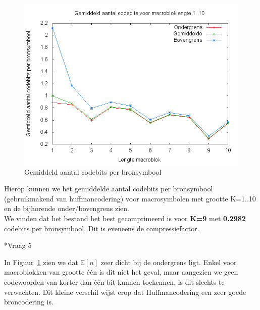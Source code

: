 \documentclass[]{article}
\begin{document}
\begin{section}
\begin{subsection}
        \begin{figure}[h]
        	  \centering
            \includegraphics[width=\textwidth]{vraag1_4.png}
            \caption{Gemiddeld aantal codebits per bronsymbool}
            \label{fig:codebits}
        \end{figure}

        Hierop kunnen we het gemiddelde aantal codebits per bronsymbool
        (gebruikmakend van huffmancodering) voor macrosymbolen met
        grootte K=1..10 en de bijhorende onder/bovengrens zien. \\

        We vinden dat het bestand het best gecomprimeerd is voor \textbf{K=9} met \textbf{0.2982} codebits per bronsymbool. Dit is eveneens de compressiefactor.
		
    \end{subsection}

    \begin{subsection}*{Vraag 5}

        In Figuur~\ref{fig:codebits} zien we dat $\mathbb{E}[n]$ zeer
        dicht bij de ondergrens ligt. Enkel voor macroblokken van
        grootte \'e\'en is dit niet het geval, maar aangezien we geen
        codewoorden van korter dan \'e\'en bit kunnen toekennen, is dit
        slechts te verwachten. Dit kleine verschil wijst erop dat
        Huffmancodering een zeer goede broncodering is.


    \end{subsection}
    

\end{section}
\end{document}
